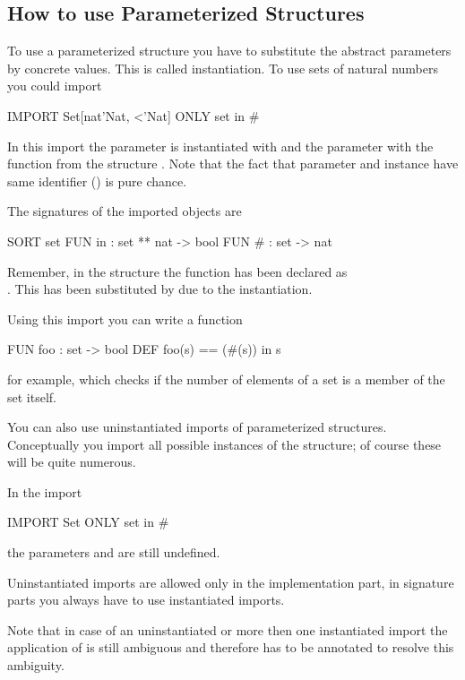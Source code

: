 \subsection{How to use Parameterized Structures}
\label{sec:use.param}
\advanced
To use a parameterized structure you have to substitute the abstract
parameters by concrete values. This is called instantiation.
To use sets of natural numbers you could import
\begin{prog}
      IMPORT Set[nat'Nat, <'Nat] ONLY set in #
\end{prog}

In this import the parameter  is instantiated with 
and the parameter \pro{<} with the function \pro{<} from the structure
.
Note that the fact that parameter and instance have same identifier
(\pro{<}) is  pure chance. 

The signatures of the imported objects are
\begin{prog}
      SORT set
      FUN in : set ** nat -> bool
      FUN #  : set -> nat
\end{prog}
Remember, in the structure  the function   has been
declared as \\ . 
This  has been substituted by  due to the
instantiation.

Using this import you can write a function
\begin{prog}
      FUN foo : set -> bool
      DEF foo(s) == (#(s)) in s
\end{prog}
for example, which checks if the number of elements of a set is a 
member of the set itself. 
\bigskip

You can also use uninstantiated imports of parameterized structures.
Conceptually you import all possible instances of the structure; of
course these will be  quite numerous.

In the import
\begin{prog}
      IMPORT Set ONLY set in #
\end{prog}
the parameters  and \pro{<} are still undefined.

 Uninstantiated imports are allowed only in the implementation part, in
signature parts you always have to use instantiated imports.

 Note that in case of an uninstantiated or more then one
instantiated import the application of  is still ambiguous
and therefore has to be annotated to resolve this ambiguity.

